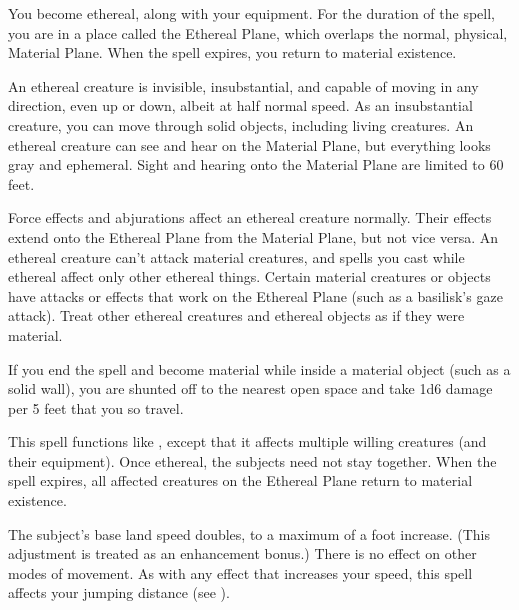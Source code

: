 \spelldur{\durshort \dismissable}
\spelleffect You become ethereal, along with your equipment. For the duration of the spell, you are in a place called the Ethereal Plane, which overlaps the normal, physical, Material Plane. When the spell expires, you return to material existence.
\par An ethereal creature is invisible, insubstantial, and capable of moving in any direction, even up or down, albeit at half normal speed. As an insubstantial creature, you can move through solid objects, including living creatures. An ethereal creature can see and hear on the Material Plane, but everything looks gray and ephemeral. Sight and hearing onto the Material Plane are limited to 60 feet.
\par Force effects and abjurations affect an ethereal creature normally. Their effects extend onto the Ethereal Plane from the Material Plane, but not vice versa. An ethereal creature can't attack material creatures, and spells you cast while ethereal affect only other ethereal things. Certain material creatures or objects have attacks or effects that work on the Ethereal Plane (such as a basilisk's gaze attack). Treat other ethereal creatures and ethereal objects as if they were material. 
\par If you end the spell and become material while inside a material object (such as a solid wall), you are shunted off to the nearest open space and take 1d6 damage per 5 feet that you so travel.

\spelleffect This spell functions like , except that it affects multiple willing creatures (and their equipment). Once ethereal, the subjects need not stay together.
\spellnotes When the spell expires, all affected creatures on the Ethereal Plane return to material existence.

\spelldur{\durshort \dismissable}
\spelleffect The subject's base land speed doubles, to a maximum of a  foot increase. (This adjustment is treated as an enhancement bonus.) There is no effect on other modes of movement.
\spellnotes As with any effect that increases your speed, this spell affects your jumping distance (see ).

